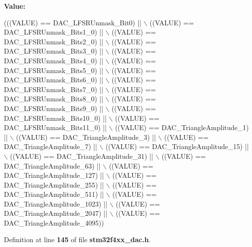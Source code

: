 {\bfseries Value\+:}
\begin{DoxyCode}
(((VALUE) == DAC_LFSRUnmask_Bit0) || \(\backslash\)
                                                      ((VALUE) == 
      DAC_LFSRUnmask_Bits1_0) || \(\backslash\)
                                                      ((VALUE) == 
      DAC_LFSRUnmask_Bits2_0) || \(\backslash\)
                                                      ((VALUE) == 
      DAC_LFSRUnmask_Bits3_0) || \(\backslash\)
                                                      ((VALUE) == 
      DAC_LFSRUnmask_Bits4_0) || \(\backslash\)
                                                      ((VALUE) == 
      DAC_LFSRUnmask_Bits5_0) || \(\backslash\)
                                                      ((VALUE) == 
      DAC_LFSRUnmask_Bits6_0) || \(\backslash\)
                                                      ((VALUE) == 
      DAC_LFSRUnmask_Bits7_0) || \(\backslash\)
                                                      ((VALUE) == 
      DAC_LFSRUnmask_Bits8_0) || \(\backslash\)
                                                      ((VALUE) == 
      DAC_LFSRUnmask_Bits9_0) || \(\backslash\)
                                                      ((VALUE) == 
      DAC_LFSRUnmask_Bits10_0) || \(\backslash\)
                                                      ((VALUE) == 
      DAC_LFSRUnmask_Bits11_0) || \(\backslash\)
                                                      ((VALUE) == 
      DAC_TriangleAmplitude_1) || \(\backslash\)
                                                      ((VALUE) == 
      DAC_TriangleAmplitude_3) || \(\backslash\)
                                                      ((VALUE) == 
      DAC_TriangleAmplitude_7) || \(\backslash\)
                                                      ((VALUE) == 
      DAC_TriangleAmplitude_15) || \(\backslash\)
                                                      ((VALUE) == 
      DAC_TriangleAmplitude_31) || \(\backslash\)
                                                      ((VALUE) == 
      DAC_TriangleAmplitude_63) || \(\backslash\)
                                                      ((VALUE) == 
      DAC_TriangleAmplitude_127) || \(\backslash\)
                                                      ((VALUE) == 
      DAC_TriangleAmplitude_255) || \(\backslash\)
                                                      ((VALUE) == 
      DAC_TriangleAmplitude_511) || \(\backslash\)
                                                      ((VALUE) == 
      DAC_TriangleAmplitude_1023) || \(\backslash\)
                                                      ((VALUE) == 
      DAC_TriangleAmplitude_2047) || \(\backslash\)
                                                      ((VALUE) == 
      DAC_TriangleAmplitude_4095))
\end{DoxyCode}


Definition at line \textbf{ 145} of file \textbf{ stm32f4xx\+\_\+dac.\+h}.

